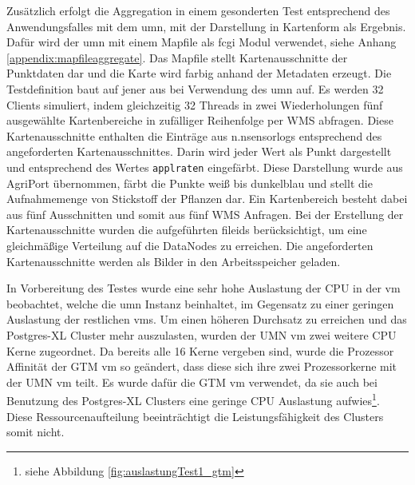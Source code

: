 Zusätzlich erfolgt die Aggregation in einem gesonderten Test entsprechend des Anwendungsfalles mit dem \Gls{umn}, mit der Darstellung in Kartenform als Ergebnis.
Dafür wird der \Gls{umn} mit einem Mapfile als \Gls{fcgi} Modul verwendet, siehe Anhang \ref{appendix:mapfileaggregate}.
Das Mapfile stellt Kartenausschnitte der Punktdaten dar und die Karte wird farbig anhand der Metadaten erzeugt.
Die Testdefinition baut auf jener aus \cite{ba:kurt} bei Verwendung des \Gls{umn} auf.
Es werden 32 Clients simuliert, indem gleichzeitig 32 Threads in zwei Wiederholungen fünf ausgewählte Kartenbereiche in zufälliger Reihenfolge per WMS abfragen.
Diese Kartenausschnitte enthalten die Einträge aus n.nsensorlogs entsprechend des angeforderten Kartenausschnittes.
Darin wird jeder Wert als Punkt dargestellt und entsprechend des Wertes \verb+applraten+ eingefärbt.
Diese Darstellung wurde aus AgriPort übernommen, färbt die Punkte weiß bis dunkelblau und stellt die Aufnahmemenge von Stickstoff der Pflanzen dar.
Ein Kartenbereich besteht dabei aus fünf Ausschnitten und somit aus fünf WMS Anfragen.
Bei der Erstellung der Kartenausschnitte wurden die aufgeführten fileids berücksichtigt, um eine gleichmäßige Verteilung auf die DataNodes zu erreichen.
Die angeforderten Kartenausschnitte werden als Bilder in den Arbeitsspeicher geladen.

In Vorbereitung des Testes wurde eine sehr hohe Auslastung der CPU in der \Gls{vm} beobachtet, welche die \Gls{umn} Instanz beinhaltet, im Gegensatz zu einer geringen Auslastung der restlichen \Gls{vm}s.
Um einen höheren Durchsatz zu erreichen und das Postgres-XL Cluster mehr auszulasten, wurden der UMN \Gls{vm} zwei weitere CPU Kerne zugeordnet.
Da bereits alle 16 Kerne vergeben sind, wurde die Prozessor Affinität der GTM \Gls{vm} so geändert, dass diese sich ihre zwei Prozessorkerne mit der UMN \Gls{vm} teilt.
Es wurde dafür die GTM \Gls{vm} verwendet, da sie auch bei Benutzung des Postgres-XL Clusters eine geringe CPU Auslastung aufwies\footnote{siehe Abbildung \ref{fig:auslastungTest1_gtm}}.
Diese Ressourcenaufteilung beeinträchtigt die Leistungsfähigkeit des Clusters somit nicht.


